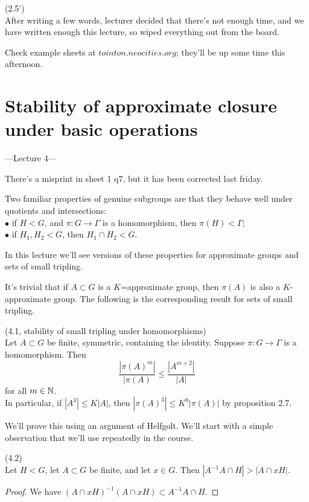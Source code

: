 \documentclass[a4paper]{article}
\begin{document}
\begin{thm} (2.5')\\
After writing a few words, lecturer decided that there's not enough time, and we have written enough this lecture, so wiped everything out from the board.
\end{thm}

Check example sheets at $tointon.neocities.org$; they'll be up some time this afternoon.

\newpage

\section{Stability of approximate closure under basic operations}

---Lecture 4---

There's a misprint in sheet 1 q7, but it has been corrected last friday.

Two familiar properties of genuine subgroups are that they behave well under quotients and intersections:\\
$\bullet$ if $H<G$, and $\pi:G \to \Gamma$ is a homomorphism, then $\pi(H) < \Gamma$;\\
$\bullet$ if $H_1,H_2 < G$, then $H_1 \cap H_2 < G$.

In this lecture we'll see versions of these properties for approximate groups and sets of small tripling.

It's trivial that if $A \subset G$ is a $K$=approximate group, then $\pi(A)$ is also a $K$-approximate group. The following is the corresponding result for sets of small tripling.

\begin{prop} (4.1, stability of small tripling under homomorphisms)\\
Let $A \subset G$ be finite, symmetric, containing the identity. Suppose $\pi:G \to \Gamma$ is a homomorphism. Then 
\[
\frac{|\pi(A)^m|}{|\pi(A)} \leq \frac{|A^{m+2}|}{|A|}
\]
for all $m \in \mathbb{N}$.\\
In particular, if $|A^3| \leq K|A|$, then $|\pi(A)^3| \leq K^9|\pi(A)|$ by proposition 2.7.
\end{prop}

We'll prove this using an argument of Helfgolt. We'll start with a simple observation that we'll use repeatedly in the course.

\begin{lemma} (4.2)\\
Let $H < G$, let $A \subset G$ be finite, and let $x \in G$. Then $|A^{-1}A \cap H| > |A \cap xH|$.
\begin{proof}
We have $(A \cap xH)^{-1} (A \cap xH) \subset A^{-1} A \cap H$.
\end{proof}
\end{lemma}
\end{document}
